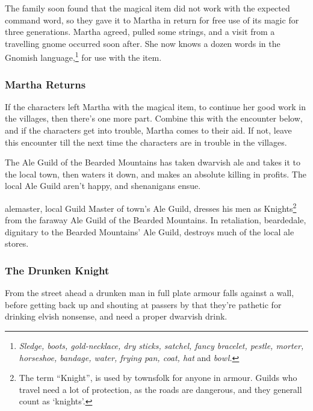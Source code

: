 The family soon found that the magical item did not work with the expected command word, so they gave it to Martha in return for free use of its magic for three generations.  Martha agreed, pulled some strings, and a visit from a travelling gnome occurred soon after.  She now knows a dozen words in the Gnomish language,\footnote{\textit{Sledge, boots, gold-necklace, dry sticks, satchel, fancy bracelet, pestle, morter, horseshoe, bandage, water, frying pan, coat, hat} and \textit{bowl.}} for use with the item.



\subsubsection{Martha Returns}

If the characters left Martha with the magical item, to continue her good work in the villages, then there's one more part.  Combine this with the encounter below, and if the characters get into trouble, Martha comes to their aid.  If not, leave this encounter till the next time the characters are in trouble in the villages.


The Ale Guild of the Bearded Mountains has taken dwarvish ale and takes it to the local town, then waters it down, and makes an absolute killing in profits.  The local Ale Guild aren't happy, and shenanigans ensue.

\Gls{alemaster}, local Guild Master of town's Ale Guild, dresses his men as Knights\footnote{The term ``Knight'', is used by townsfolk for anyone in armour.  Guilds who travel need a lot of protection, as the roads are dangerous, and they generall count as `knights'.} from the faraway Ale Guild of the Bearded Mountains.  In retaliation, \gls{beardedale}, dignitary to the Bearded Mountains' Ale Guild, destroys much of the local ale stores.

\subsubsection{The Drunken Knight}

\begin{boxtext}
	From the street ahead a drunken man in full plate armour falls against a wall, before getting back up and shouting at passers by that they're pathetic for drinking elvish nonsense, and need a proper dwarvish drink.
\end{boxtext}

